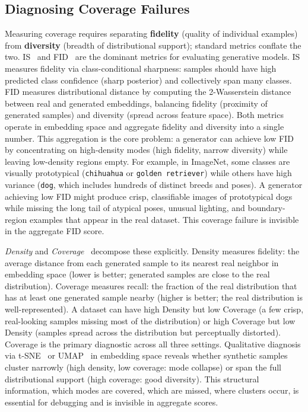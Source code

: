 \documentclass[12pt, a4paper, twoside]{book}
\numberwithin{equation}{chapter}
\theoremstyle{plain}
\theoremstyle{definition}
\theoremstyle{remark}
\newenvironment{foldable}{}{}
\providecommand{\DIFaddtex}[1]{{\protect\color{blue}\uwave{#1}}} %
\providecommand{\DIFaddbegin}{} %
\providecommand{\DIFaddend}{} %
\providecommand{\DIFadd}[1]{\texorpdfstring{\DIFaddtex{#1}}{#1}} %
\newcommand{\DIFaddincludegraphics}[2][]{{\color{blue}\fbox{\DIFOincludegraphics[#1]{#2}}}} %
\DeclareRobustCommand{\DIFaddbegin}{\DIFOaddbegin \let\includegraphics\DIFaddincludegraphics} %
\DeclareRobustCommand{\DIFaddend}{\DIFOaddend \let\includegraphics\DIFOincludegraphics} %
\begin{document}
\subsection{Diagnosing Coverage Failures} \label{sec:25-background-distribution-diagnosis}
\begin{foldable}
  Measuring coverage requires separating \textbf{\DIFaddbegin \DIFadd{sample }\DIFaddend fidelity} (quality of individual examples) from \textbf{diversity} (breadth of distributional support); standard metrics conflate the two.
  \Ac{IS}~\cite{salimans2016improved} and \ac{FID}~\cite{heusel2017gans} are the dominant metrics for evaluating generative models.
  \ac{IS} measures fidelity via class-conditional sharpness: samples should have high predicted class confidence (sharp posterior) and collectively span many classes.
  \ac{FID} measures distributional distance by computing the 2-Wasserstein distance between real and generated embeddings, balancing fidelity (proximity of generated samples) and diversity (spread across feature space).
  Both metrics operate in embedding space and aggregate fidelity and diversity into a single number.
  This aggregation is the core problem: a generator can achieve low \ac{FID} by concentrating on high-density modes (high fidelity, narrow diversity) while leaving low-density regions empty.
  For example, in ImageNet, some classes are visually prototypical (\texttt{chihuahua} or \texttt{golden retriever}) while others have high variance (\texttt{dog}, which includes hundreds of distinct breeds and poses).
  A generator achieving low \ac{FID} might produce crisp, classifiable images of prototypical dogs while missing the long tail of atypical poses, unusual lighting, and boundary-region examples that appear in the real dataset.
  This coverage failure is invisible in the aggregate \ac{FID} score.
\end{foldable}

\begin{foldable}
  \textit{Density} and \textit{Coverage}~\cite{naeem2020reliable} decompose these explicitly.
  Density measures \DIFaddbegin \DIFadd{sample }\DIFaddend fidelity: the average distance from each generated sample to its nearest real neighbor in embedding space (lower is better; generated samples are close to the real distribution).
  Coverage measures recall: the fraction of the real distribution that has at least one generated sample nearby (higher is better; the real distribution is well-represented).
  A dataset can have high Density but low Coverage (a few crisp, real-looking samples missing most of the distribution) or high Coverage but low Density (samples spread across the distribution but perceptually distorted).
  Coverage is the primary diagnostic across all three settings.
  Qualitative diagnosis via t-SNE~\cite{van2008visualizing} or UMAP~\cite{mcinnes2018umap} in embedding space reveals whether synthetic samples cluster narrowly (high density, low coverage: mode collapse) or span the full distributional support (high coverage: good diversity).
  This structural information, which modes are covered, which are missed, where clusters occur, is essential for debugging and is invisible in aggregate scores.
\end{foldable}
\end{document}
